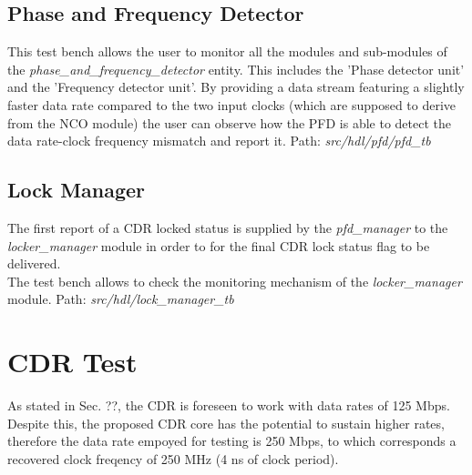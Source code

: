 \documentclass[11pt]{article}
\renewcommand{\>}{\rangle} \renewcommand{\emptyset}{\varnothing}
\begin{document}
\subsection{Phase and Frequency Detector}
This test bench allows the user to monitor all the modules and sub-modules of
the \textit{phase\_and\_frequency\_detector} entity. This includes the 'Phase
detector unit' and the 'Frequency detector unit'. By providing a data stream
featuring a slightly faster data rate compared to the two input clocks (which
are supposed to derive from the NCO module) the user can observe how the PFD is
able to detect the data rate-clock frequency mismatch and report it.\bigbreak
Path: \textit{src/hdl/pfd/pfd\_tb}

\subsection{Lock Manager}
The first report of a CDR locked status is supplied by the \textit{pfd\_manager}
to the \textit{locker\_manager} module in order to for the final CDR lock status
flag to be delivered.\\
The test bench allows to check the monitoring mechanism of the
\textit{locker\_manager} module. \bigbreak Path:
\textit{src/hdl/lock\_manager\_tb}

\section{CDR Test}
As stated in Sec. ??, the CDR is foreseen to work with data rates of 125 Mbps.
Despite this, the proposed CDR core has the potential to sustain higher rates,
therefore the data rate empoyed for testing is 250 Mbps, to which corresponds a
recovered clock freqency of 250 MHz (4 ns of clock period).
\end{document}
